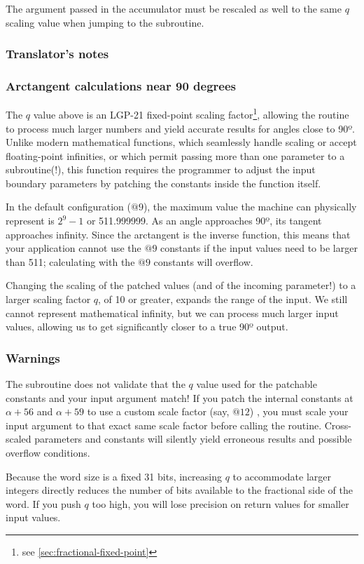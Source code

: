\documentclass{article}
\begin{document}
The argument passed in the accumulator must be rescaled as well to the same $q$ scaling value when jumping to the subroutine.

\subsubsection*{Translator's notes}
\subsubsection*{Arctangent calculations near 90 degrees}
The $q$ value above is an LGP-21 fixed-point scaling factor\footnote{see \ref{sec:fractional-fixed-point}}, allowing the routine to process much larger numbers and yield accurate results for angles close to 90º. Unlike modern mathematical functions, which seamlessly handle scaling or accept floating-point infinities, or which permit passing more than one parameter to a subroutine(!), this function requires the programmer to adjust the input boundary parameters by patching the constants inside the function itself.

In the default configuration ($@9$), the maximum value the machine can physically represent is $2^9-1$ or 511.999999. As an angle approaches 90º, its tangent approaches infinity. Since the arctangent is the inverse function, this means that your application cannot use the $@9$ constants if the input values need to be larger than 511; calculating with the $@9$ constants will overflow.

Changing the scaling of the patched values (and of the incoming parameter!) to a larger scaling factor $q$, of 10 or greater, expands the range of the input. We still cannot represent mathematical infinity, but we can process much larger input values, allowing us to get significantly closer to a true 90º output.

\subsubsection*{Warnings}
The subroutine does not validate that the $q$ value used for the patchable constants and your input argument match! If you patch the internal constants at $\alpha+56$ and $\alpha+59$ to use a custom scale factor (say, $@12$) , you must scale your input argument to that exact same scale factor before calling the routine. Cross-scaled parameters and constants will silently yield erroneous results and possible overflow conditions.

Because the word size is a fixed 31 bits, increasing $q$ to accommodate larger integers directly reduces the number of bits available to the fractional side of the word. If you push $q$ too high, you will lose precision on return values for smaller input values.
\end{document}
